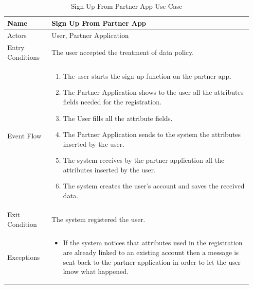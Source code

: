 \begin{enumerate}
\FloatBarrier
\begin{table}[h]
\begin{tabular}{|p{3.4cm}|p{}|}
\hline
Name             & Sign Up From Partner App\\ \hline
Actors           & User, Partner Application  \\ \hline
Entry Conditions & The user accepted the treatment of data policy.  \\ \hline
Event Flow       & \begin{enumerate}
			\item The user starts the sign up function on the partner app.
			\item The Partner Application shows to the user all the attributes fields needed for the registration.
            \item The User fills all the attribute fields.
            \item The Partner Application sends to the system the attributes inserted by the user.
            \item The system receives by the partner application all the attributes inserted by the user.
            \item The system creates the user's account and saves the received data.
        \end{enumerate}\\ \hline
Exit Condition   & The system registered the user.\\ \hline
Exceptions       & \begin{itemize}
\item If the system notices that attributes used in the registration are already linked to an existing account then a message is sent back to the partner application in order to let the user know what happened.
\end{itemize}\\ \hline
\end{tabular}
\caption{Sign Up From Partner App Use Case}
\end{table}
\FloatBarrier


\end{enumerate}
